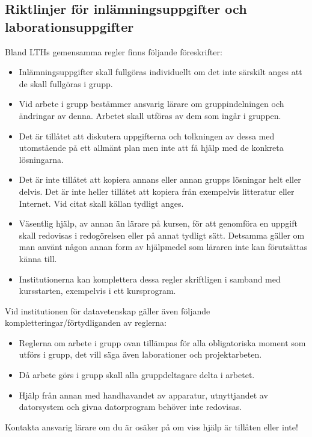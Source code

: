 \documentclass[fleqn, article, a4paper]{memoir}
\begin{document}
\newpage
\subsection*{Riktlinjer för inlämningsuppgifter och laborationsuppgifter}
Bland LTHs gemensamma regler finns följande föreskrifter:

\begin{itemize}\tightlist
	\item Inlämningsuppgifter skall fullgöras individuellt om det inte särskilt anges att de skall fullgöras i grupp.
	\item Vid arbete i grupp bestämmer ansvarig lärare om gruppindelningen och ändringar av denna. Arbetet skall utföras av dem som ingår i gruppen.
	\item Det är tillåtet att diskutera uppgifterna och tolkningen av dessa med utomstående på ett allmänt plan men inte att få hjälp med de konkreta lösningarna.
	\item Det är inte tillåtet att kopiera annans eller annan grupps lösningar helt eller delvis. Det är inte heller tillåtet att kopiera från exempelvis litteratur eller Internet. Vid citat skall källan tydligt anges.
	\item Väsentlig hjälp, av annan än lärare på kursen, för att genomföra en uppgift skall redovisas i redogörelsen eller på annat tydligt sätt. Detsamma gäller om man använt någon annan form av hjälpmedel som läraren inte kan förutsättas känna till.
	\item Institutionerna kan komplettera dessa regler skriftligen i samband med kursstarten, exempelvis i ett kursprogram.
\end{itemize}

\n Vid institutionen för datavetenskap gäller även följande kompletteringar/förtydliganden av reglerna:

\begin{itemize}\tightlist
	\item Reglerna om arbete i grupp ovan tillämpas för alla obligatoriska moment som utförs i grupp, det vill säga även laborationer och projektarbeten.
	\item Då arbete görs i grupp skall alla gruppdeltagare delta i arbetet.
	\item Hjälp från annan med handhavandet av apparatur, utnyttjandet av datorsystem och givna datorprogram behöver inte redovisas.
\end{itemize}

\n Kontakta ansvarig lärare om du är osäker på om viss hjälp är tillåten eller inte!
\end{document}
